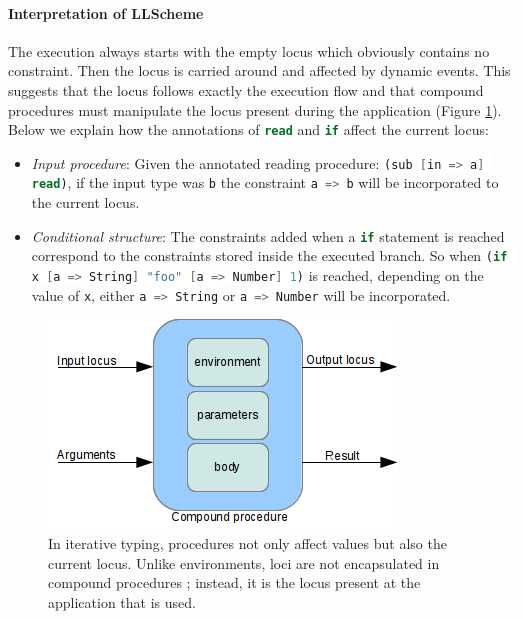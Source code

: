 \documentclass[a4paper]{report}
\newcommand{\ischeme}[1]{\colorbox{white}{\lstinline[language=scheme]&#1&}} %
\newcommand{\reffig}[1]{(Figure \ref{#1})}
\begin{document}
\paragraph{Interpretation of LLScheme} The execution always starts with the empty locus which obviously contains no constraint. Then the locus is carried around and affected by dynamic events. This suggests that the locus follows exactly the execution flow and that compound procedures must manipulate the locus present during the application \reffig{mono_proc}. Below we explain how the annotations of \ischeme{read} and \ischeme{if} affect the current locus:
\begin{itemize}
\item \emph{Input procedure}: Given the annotated reading procedure: \ischeme{(sub [in => a] read)}, if the input type was \ischeme{b} the constraint \ischeme{a => b} will be incorporated to the current locus.
\item \emph{Conditional structure}: The constraints added when a \ischeme{if} statement is reached correspond to the constraints stored inside the executed branch. So when \ischeme{(if x [a => String] "foo" [a => Number] 1)} is reached, depending on the value of \ischeme{x}, either \ischeme{a => String} or \ischeme{a => Number} will be incorporated.
\end{itemize}

\begin{figure}
\centering
\includegraphics{images/mono_proc.png}
\caption{In iterative typing, procedures not only affect values but also the current locus. Unlike environments, loci are not encapsulated in compound procedures ; instead, it is the locus present at the application that is used.}
\label{mono_proc}
\end{figure}
\end{document}
